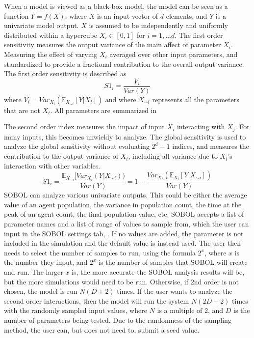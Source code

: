 When a model is viewed as a black-box model, the model can be seen as a function $Y=f(X)$, where $X$ is an input vector of $d$ elements, and $Y$ is a univariate model output.
$X$ is assumed to be independently and uniformly distributed within a hypercube $X_i \in [0, 1]$ for $i=1, \dots d$.
The first order sensitivity measures the output variance of the main affect of parameter $X_i$.
Measuring the effect of varying $X_i$ averaged over other input parameters, and standardized to provide a fractional contribution to the overall output variance.
The first order sensitivity is described as
\[
    S1_i = \frac{V_i}{\textit{Var}(Y)}
\] where $V_i = \textit{Var}_{X_i}(\mathbb{E}_{X_{\sim i}}[Y|X_i])$ and where $X_{\sim i}$ represents all the parameters that are not $X_i$.
All parameters are summarized in 

The second order index measures the impact of input $X_i$ interacting with $X_j$. For many inputs, this becomes unwieldy to analyze.
The global sensitivity is used to analyze the global sensitivity without evaluating $2^d-1$ indices, and measures the contribution to the output variance of $X_i$, including all variance due to $X_i$'s interaction with other variables.
\[
    S1_i = \frac{\mathbb{E}_{X_{\sim i}}[\textit{Var}_{X_i}(Y|X_{\sim i}))}{\textit{Var}(Y)} = 1 - \frac{\textit{Var}_{X_i}(\mathbb{E}_{X_i}[Y|X_{\sim i}])}{\textit{Var}(Y)}
\]
SOBOL can analyze various univariate outputs.
This could be either the average value of an agent population, the variance in population count, the time at the peak of an agent count, the final population value, etc. \newline
SOBOL accepts a list of parameter names and a list of range of values to sample from, which the user can input in the SOBOL settings tab, . 
If no values are added, the parameter is not included in the simulation and the default value is instead used. 
The user then needs to select the number of samples to run, using the formula $2^x$, where $x$ is the number they input, and $2^x$ is the number of samples that SOBOL will create and run.
The larger $x$ is, the more accurate the SOBOL analysis results will be, but the more simulations would need to be run. \newline
Otherwise, if 2nd order is not chosen, the model is run $N(D+2)$ times.
If the user wants to analyze the second order interactions, then the model will run the system $N(2D+2)$ times with the randomly sampled input values, where $N$ is a multiple of 2, and $D$ is the number of parameters being tested.
Due to the randomness of the sampling method, the user can, but does not need to, submit a seed value. 

